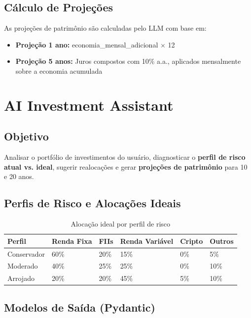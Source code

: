 \documentclass[12pt, a4paper, oneside]{report}
\begin{document}
\subsection{Cálculo de Projeções}

As projeções de patrimônio são calculadas pelo LLM com base em:
\begin{itemize}
  \item \textbf{Projeção 1 ano:} economia\_mensal\_adicional $\times$ 12
  \item \textbf{Projeção 5 anos:} Juros compostos com 10\% a.a., aplicados mensalmente sobre a economia acumulada
\end{itemize}

\section{AI Investment Assistant}

\subsection{Objetivo}

Analisar o portfólio de investimentos do usuário, diagnosticar o \textbf{perfil de risco atual vs. ideal}, sugerir realocações e gerar \textbf{projeções de patrimônio} para 10 e 20 anos.

\subsection{Perfis de Risco e Alocações Ideais}

\begin{table}[H]
\centering
\caption{Alocação ideal por perfil de risco}
\begin{tabularx}{\textwidth}{l l l l l l}
\toprule
Perfil & Renda Fixa & FIIs & Renda Variável & Cripto & Outros \\
\midrule
Conservador & 60\% & 20\% & 15\% & 0\% & 5\% \\
Moderado & 40\% & 25\% & 25\% & 0\% & 10\% \\
Arrojado & 20\% & 20\% & 45\% & 5\% & 10\% \\
\bottomrule
\end{tabularx}
\end{table}

\subsection{Modelos de Saída (Pydantic)}
\end{document}
